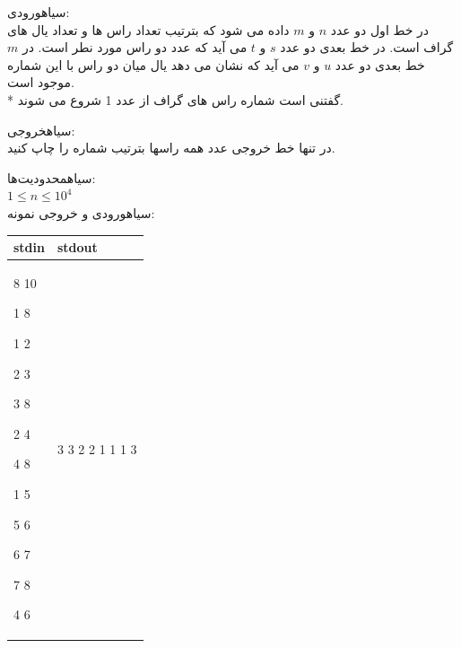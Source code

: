 \noindent
{}‌سیاه{ورودی:}\\
در خط اول دو عدد $n$ و $m$  داده می شود که بترتیب تعداد راس ها و تعداد یال های گراف است.
در خط بعدی دو عدد $s$ و $t$ می آید که عدد دو راس مورد نطر است.
در $m$ خط بعدی دو عدد $u$ و $v$ می آید که نشان می دهد یال میان دو راس با این شماره موجود است.\\*
گفتنی است شماره راس های گراف از عدد 1 شروع می شوند.

\noindent
{}‌سیاه{خروجی:}\\
در تنها خط خروجی عدد همه راسها بترتیب شماره را چاپ کنید.

‌سیاه{محدودیت‌ها:}\\
$1\leq n\leq 10^4$\\

‌سیاه{ورودی و خروجی نمونه:}\\

\begin{latin}
	\begin{tabularx}{\textwidth}{|X | X|}
		\hline
		\textbf{stdin} &
		\textbf{stdout}\\
		\hline
		8 10
		
		1 8
		
		1 2
		
		2 3
		
		3 8
		
		2 4
		
		4 8
		
		1 5
		
		5 6
		
		6 7
		
		7 8
		
		4 6&
		3 3 2 2 1 1 1 3\\
		\hline
		
	\end{tabularx}
\end{latin}



